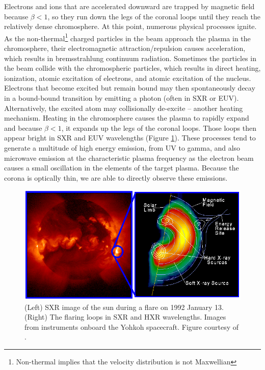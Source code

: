 Electrons and ions that are accelerated downward are trapped by magnetic field because $\beta < 1$, so they run down the legs of the coronal loops until they reach the relatively dense chromosphere. At this point, numerous physical processes ignite. As the non-thermal\footnote{Non-thermal implies that the velocity distribution is not Maxwellian} charged particles in the beam approach the plasma in the chromosphere, their electromagnetic attraction/repulsion causes acceleration, which results in bremsstrahlung continuum radiation. Sometimes the particles in the beam collide with the chromospheric particles, which results in direct heating, ionization, atomic excitation of electrons, and atomic excitation of the nucleus. Electrons that become excited but remain bound may then spontaneously decay in a bound-bound transition by emitting a photon (often in SXR or EUV). Alternatively, the excited atom may collisionally de-excite -- another heating mechanism. Heating in the chromosphere causes the plasma to rapidly expand and because $\beta < 1$, it expands up the legs of the coronal loops. Those loops then appear bright in SXR and EUV wavelengths (Figure \ref{fig:flaresxrhxr}). These processes tend to generate a multitude of high energy emission, from UV to gamma, and also microwave emission at the characteristic plasma frequency as the electron beam causes a small oscillation in the elements of the target plasma. Because the corona is optically thin, we are able to directly observe these emissions. 

\begin{figure}[!h]
    \begin{center}
	    \includegraphics[width=\textwidth]{Images/FlareInSXRAndHXR.png}
    \end{center}
    \caption[Solar flare in soft and hard X-ray light]{
        (Left) SXR image of the sun during a flare on 1992 January 13. (Right) The flaring loops in SXR and HXR 
        wavelengths. Images from instruments onboard the Yohkoh spacecraft. Figure courtesy of \citet{Holman2008}. 
    }
    \label{fig:flaresxrhxr}
\end{figure}

